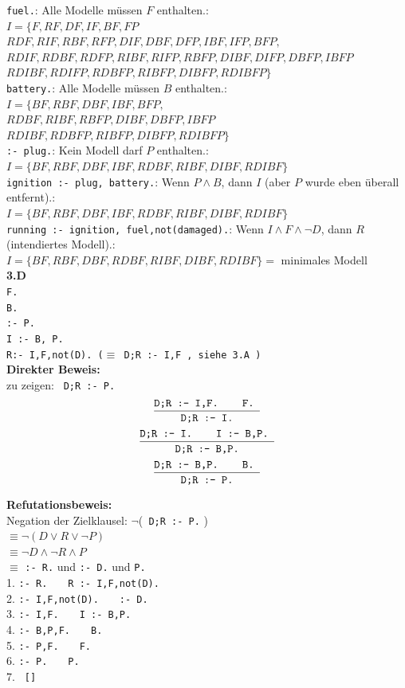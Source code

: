 \documentclass[a4paper, dvipsnames]{article}
\begin{document}
\texttt{fuel.}: Alle Modelle müssen $F$ enthalten.:\\
$I = \lbrace F, RF, DF, IF, BF, FP$\\
$RDF, RIF, RBF,RFP, DIF, DBF, DFP, IBF, IFP, BFP, $\\
$RDIF,  RDBF,RDFP,RIBF,  RIFP, RBFP, DIBF, DIFP, DBFP, IBFP$\\
$RDIBF, RDIFP, RDBFP, RIBFP, DIBFP, RDIBFP\rbrace$\\

\texttt{battery.}: Alle Modelle müssen $B$ enthalten.:\\
$I = \lbrace  BF,  RBF,DBF,  IBF, BFP, $\\
$  RDBF,RIBF,  RBFP, DIBF,  DBFP, IBFP$\\
$RDIBF,  RDBFP, RIBFP, DIBFP, RDIBFP\rbrace$\\
\newpage
\texttt{:- plug.}: Kein Modell darf $P$ enthalten.:\\
$I = \lbrace  BF,  RBF,DBF,  IBF, RDBF,RIBF, DIBF , RDIBF \rbrace$\\

\texttt{ignition :- plug, battery.}: Wenn $P \wedge B$, dann $I$ (aber $P$ wurde eben überall entfernt).:\\
$I = \lbrace  BF,  RBF,DBF,  IBF, RDBF,RIBF, DIBF , RDIBF \rbrace$\\

\texttt{running :- ignition, fuel,not(damaged).}: Wenn $I \wedge F \wedge \neg D$, dann $R $ (intendiertes Modell).:\\
$I = \lbrace  BF,  RBF,DBF,  RDBF,RIBF,DIBF , RDIBF  \rbrace =$ minimales Modell\\


{\bfseries 3.D}\\
\texttt{F.\\
B.\\
:- P.\\
I :- B, P.\\
R:- I,F,not(D). ($\equiv$ D;R :- I,F , siehe 3.A )}\\

\textbf{Direkter Beweis: }\\
zu zeigen: \texttt{ D;R :- P.} \\
$$\frac{\texttt{D;R :- I,F. \; \; F. }}{\texttt{D;R :- I.}}$$
$$\frac{\texttt{D;R :- I. \; \; I :- B,P. }}{\texttt{D;R :- B,P.}}$$
$$\frac{\texttt{D;R :- B,P. \; \; B. }}{\texttt{D;R :- P.}}$$

\textbf{Refutationsbeweis:}\\
Negation der Zielklausel: $\neg$(\texttt{ D;R :- P.} )\\
$\equiv \neg ( D \vee R \vee  \neg P )$\\
$\equiv \neg  D \wedge \neg  R \wedge  P $\\
$\equiv$ \texttt{:- R.} und \texttt{:- D.} und \texttt{P.} \\

1. \texttt{:- R.  $\;\;\;$        R :- I,F,not(D).}\\
2. \texttt{:- I,F,not(D).  $\;\;\;$        :- D.}\\
3. \texttt{:- I,F.  $\;\;\;$       I :- B,P.}\\
4. \texttt{:- B,P,F. $\;\;\;$       B.}\\
5. \texttt{:- P,F. $\;\;\;$       F.}\\
6. \texttt{:- P.  $\;\;\;$       P.}\\
7. \texttt{       [] }\\
\end{document}
